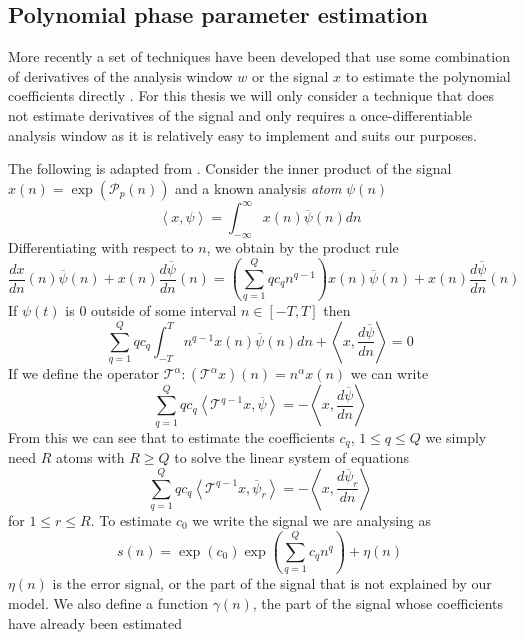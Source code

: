 \subsection{Polynomial phase parameter estimation}
\label{sec:ddm_description}
More recently a set of techniques have been developed that use some combination
of derivatives of the analysis window $w$ or the signal $x$ to estimate the
polynomial coefficients directly \cite{hamilton2011non}. For this thesis we will
only consider a technique that does not estimate derivatives of the signal and
only requires a once-differentiable analysis window as it is relatively easy to
implement and suits our purposes.

The following is adapted from \cite{betser2009sinusoidal}. Consider the inner
product of the signal $x(n) = \exp(\mathcal{P}_p(n)) $ and a
known analysis \textit{atom} $\psi(n)$
\[
    \left\langle x,\psi \right\rangle =
    \int_{-\infty}^{\infty}x(n)\overline{\psi}(n)dn
\]
Differentiating with respect to $n$, we obtain by the product rule
\[
    \frac{dx}{dn}(n)\overline{\psi}(n)
    + x(n)\frac{d\overline{\psi}}{dn}(n)
    = \left( \sum_{q=1}^{Q} q c_q n^{q-1} \right) x(n)\overline{\psi}(n)
    + x(n)\frac{d\overline{\psi}}{dn}(n)
\]
If $\psi(t)$ is 0 outside of some interval $n \in [-T,T]$ then
\[
    \sum_{q=1}^{Q} q c_q \int_{-T}^{T} n^{q-1} x(n) \overline{\psi}(n) dn
    + \left\langle x, \frac{d\overline{\psi}}{dn} \right\rangle = 0
\]
If we define the operator $\mathcal{T}^{\alpha} : (\mathcal{T}^{\alpha}x)(n) =
n^{\alpha}x(n)$ we can write
\[ 
    \sum_{q=1}^{Q} q c_q 
    \left\langle \mathcal{T}^{q-1} x , \overline{\psi} \right\rangle
    = -\left\langle x, \frac{d\overline{\psi}}{dn} \right\rangle
\]
From this we can see that to estimate the coefficients $c_q$, $ 1 \leq q \leq Q
$ we simply need $R$ atoms with $R \geq Q$ to solve the linear system of
equations
\begin{equation}
    \label{eq:ddmsyseq}
    \sum_{q=1}^{Q} q c_q 
    \left\langle \mathcal{T}^{q-1} x , \overline{\psi}_{r} \right\rangle
    = -\left\langle x, \frac{d\overline{\psi}_{r}}{dn} \right\rangle
\end{equation}
for $1 \leq r \leq R$. To estimate $c_0$ we write the signal we are analysing as
\[
    s(n) = \exp(c_0) \exp \left( \sum_{q=1}^{Q} c_q n^{q} \right) + \eta (n)
\]
$\eta (n)$ is the error signal, or the part of the signal that is not explained
by our model. We also define a function $\gamma (n)$, the part of the signal
whose coefficients have already been estimated
